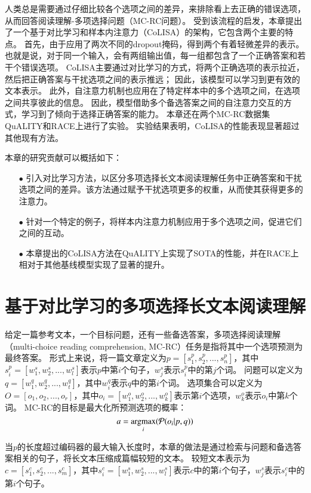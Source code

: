 人类总是需要通过仔细比较各个选项之间的差异，来排除看上去正确的错误选项，从而回答阅读理解-多项选择问题（MC-RC问题）\cite{daniel2017thinking}。
受到该流程的启发，本章提出了一个基于对比学习和样本内注意力（CoLISA）的架构，它包含两个主要的特点。
首先，由于应用了两次不同的dropout掩码，得到两个有着轻微差异的表示。
也就是说，对于同一个输入，会有两组输出值，每一组都包含了一个正确答案和若干个错误选项。
CoLISA主要通过对比学习的方式，将两个正确选项的表示拉近，然后把正确答案与干扰选项之间的表示推远；
因此，该模型可以学习到更有效的文本表示。
此外，自注意力机制\cite{vaswani2017attention}也应用在了特定样本中的多个选项之间，在选项之间共享彼此的信息。
因此，模型借助多个备选答案之间的自注意力交互的方式，学习到了倾向于选择正确答案的能力。
本章还在两个MC-RC数据集QuALITY\cite{pang2021quality}和RACE\cite{lai2017race}上进行了实验。
实验结果表明，CoLISA的性能表现显著超过其他现有方法。

本章的研究贡献可以概括如下：
\begin{itemize}
    \item[$\bullet$] 引入对比学习方法，以区分多项选择长文本阅读理解任务中正确答案和干扰选项之间的差异。该方法通过赋予干扰选项更多的权重，从而使其获得更多的注意力。
    \item[$\bullet$] 针对一个特定的例子，将样本内注意力机制应用于多个选项之间，促进它们之间的互动。
    \item[$\bullet$] 本章提出的CoLISA方法在QuALITY上实现了SOTA的性能，并在RACE上相对于其他基线模型实现了显著的提升。
\end{itemize}


\section{基于对比学习的多项选择长文本阅读理解}
给定一篇参考文本，一个目标问题，还有一些备选答案，多项选择阅读理解（multi-choice reading comprehension, MC-RC）任务是指将其中一个选项预测为最终答案。
形式上来说，将一篇文章定义为$p=[s^p_1, s^p_2, ..., s^p_n]$，其中$s^p_i=[w^s_1, w^s_2, ..., w^s_l]$表示$p$中第$i$个句子，$w^s_j$表示$s^p_i$中的第$j$个词。
问题可以定义为$q=[w^q_1, w^q_2, ..., w^q_t]$，其中$w^q_i$表示$q$中的第$i$个词。
选项集合可以定义为$O=[o_1, o_2, ..., o_r]$，其中$o_i=[w^o_1, w^o_2, ..., w^o_k]$表示第$i$个选项，$w^o_k$表示$o_i$中第$k$个词。
MC-RC的目标是最大化所预测选项的概率：
\begin{equation}
    a = \operatorname*{argmax}_i(\mathcal P(o_i|p,q))
\end{equation}

当$p$的长度超过编码器的最大输入长度时，本章的做法是通过检索与问题和备选答案相关的句子，将长文本压缩成篇幅较短的文本。
较短文本表示为$c=[s^c_1, s^c_2, ..., s^c_m]$，其中$s^c_i=[w^s_1, w^s_2, ..., w^s_l]$表示$c$中的第$i$个句子，$w^s_j$表示$s^c_i$中的第$i$个句子。

